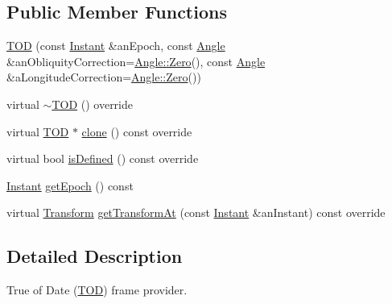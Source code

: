 \subsection*{Public Member Functions}
\begin{DoxyCompactItemize}
\item 
\hyperlink{classostk_1_1physics_1_1coord_1_1frame_1_1provider_1_1_t_o_d_a457cb11c5a20ea3b575aa6c3887bd085}{T\+OD} (const \hyperlink{classostk_1_1physics_1_1time_1_1_instant}{Instant} \&an\+Epoch, const \hyperlink{classostk_1_1physics_1_1units_1_1_angle}{Angle} \&an\+Obliquity\+Correction=\hyperlink{classostk_1_1physics_1_1units_1_1_angle_a4454975f87e5d3532cf8b819819207e7}{Angle\+::\+Zero}(), const \hyperlink{classostk_1_1physics_1_1units_1_1_angle}{Angle} \&a\+Longitude\+Correction=\hyperlink{classostk_1_1physics_1_1units_1_1_angle_a4454975f87e5d3532cf8b819819207e7}{Angle\+::\+Zero}())
\item 
virtual \hyperlink{classostk_1_1physics_1_1coord_1_1frame_1_1provider_1_1_t_o_d_a1e59c3f3d3d31e768deb99abb502b577}{$\sim$\+T\+OD} () override
\item 
virtual \hyperlink{classostk_1_1physics_1_1coord_1_1frame_1_1provider_1_1_t_o_d}{T\+OD} $\ast$ \hyperlink{classostk_1_1physics_1_1coord_1_1frame_1_1provider_1_1_t_o_d_ad374cdce01f5872311b61695502dd4e4}{clone} () const override
\item 
virtual bool \hyperlink{classostk_1_1physics_1_1coord_1_1frame_1_1provider_1_1_t_o_d_a57f8d993ac693b2cd39b4a99faadc92f}{is\+Defined} () const override
\item 
\hyperlink{classostk_1_1physics_1_1time_1_1_instant}{Instant} \hyperlink{classostk_1_1physics_1_1coord_1_1frame_1_1provider_1_1_t_o_d_aa57fb466a29c74c0f7e79087a7b90d91}{get\+Epoch} () const
\item 
virtual \hyperlink{classostk_1_1physics_1_1coord_1_1_transform}{Transform} \hyperlink{classostk_1_1physics_1_1coord_1_1frame_1_1provider_1_1_t_o_d_adc74a9cba68df62bf135f5ee775bd4a1}{get\+Transform\+At} (const \hyperlink{classostk_1_1physics_1_1time_1_1_instant}{Instant} \&an\+Instant) const override
\end{DoxyCompactItemize}


\subsection{Detailed Description}
True of Date (\hyperlink{classostk_1_1physics_1_1coord_1_1frame_1_1provider_1_1_t_o_d}{T\+OD}) frame provider. 

